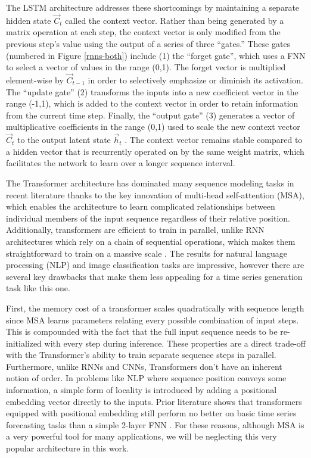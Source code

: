 The LSTM architecture addresses these shortcomings by maintaining a separate hidden state $\vec{C}_t$ called the context vector. Rather than being generated by a matrix operation at each step, the context vector is only modified from the previous step's value using the output of a series of three ``gates.'' These gates (numbered in Figure \ref{rnns-both})  include (1) the ``forget gate'', which uses a FNN to select a vector of values in the range (0,1). The forget vector is multiplied element-wise by $\vec{C}_{t-1}$ in order to selectively emphasize or diminish its activation. The ``update gate'' (2) transforms the inputs into a new coefficient vector in the range (-1,1), which is added to the context vector in order to retain information from the current time step. Finally, the ``output gate'' (3) generates a vector of multiplicative coefficients in the range (0,1) used to scale the new context vector $\vec{C}_t$ to the output latent state $\vec{h}_t$ \citep{hochreiter_long_1997}. The context vector remains stable compared to a hidden vector that is recurrently operated on by the same weight matrix, which facilitates the network to learn over a longer sequence interval.

The Transformer architecture has dominated many sequence modeling tasks in recent literature thanks to the key innovation of multi-head self-attention (MSA), which enables the architecture to learn complicated relationships between individual members of the input sequence regardless of their relative position. Additionally, transformers are efficient to train in parallel, unlike RNN architectures which rely on a chain of sequential operations, which makes them straightforward to train on a massive scale \citep{vaswani_attention_2017}. The results for natural language processing (NLP) \citep{devlin_bert_2019} and image classification \citep{dosovitskiy_image_2021} tasks are impressive, however there are several key drawbacks that make them less appealing for a time series generation task like this one.

First, the memory cost of a transformer scales quadratically with sequence length since MSA learns parameters relating every possible combination of input steps. This is compounded with the fact that the full input sequence needs to be re-initialized with every step during inference. These properties are a direct trade-off with the Transformer's ability to train separate sequence steps in parallel. Furthermore, unlike RNNs and CNNs, Transformers don't have an inherent notion of order. In problems like NLP where sequence position conveys some information, a simple form of locality is introduced by adding a positional embedding vector directly to the inputs. Prior literature shows that transformers equipped with positional embedding still perform no better on basic time series forecasting tasks than a simple 2-layer FNN \citep{zeng_are_2022}. For these reasons, although MSA is a very powerful tool for many applications, we will be neglecting this very popular architecture in this work.
